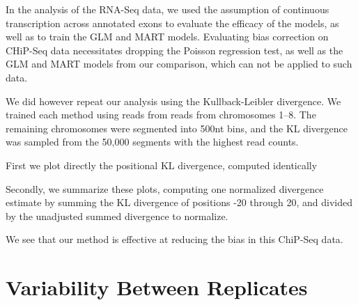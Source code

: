 \documentclass[letterpaper]{article}
\begin{document}
\begin{comment}
\begin{center}
\texttt{[image: fig/freqs\_cao.pdf]}
\end{center}
\end{comment}

In the analysis of the RNA-Seq data, we used the assumption of continuous
transcription across annotated exons to evaluate the efficacy of the models, as
well as to train the GLM and MART models. Evaluating bias correction on CHiP-Seq
data necessitates dropping the Poisson regression test, as well as the GLM and
MART models from our comparison, which can not be applied to such data.

We did however repeat our analysis using the Kullback-Leibler divergence.  We
trained each method using reads from reads from chromosomes 1--8. The remaining
chromosomes were segmented into 500nt bins, and the KL divergence was sampled
from the 50,000 segments with the highest read counts.

First we plot directly the positional KL divergence, computed identically 

\begin{comment}
\begin{center}
\texttt{[image: fig/cao-kl.pdf]}
\end{center}
\end{comment}

Secondly, we summarize these plots, computing one normalized divergence
estimate by summing the KL divergence of positions -20 through 20, and
divided by the unadjusted summed divergence to normalize.

\begin{comment}
\begin{center}
\texttt{[image: fig/cao-kl-delta.pdf]}
\end{center}
\end{comment}

We see that our method is effective at reducing the bias in this ChiP-Seq data.


\section{Variability Between Replicates}
\end{document}
